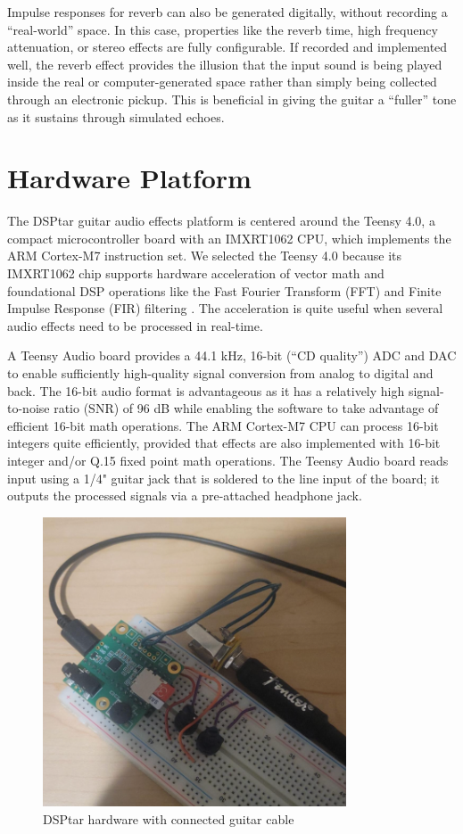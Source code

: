 \documentclass[conference]{IEEEtran}
\begin{document}
Impulse responses for reverb can also be generated digitally, without recording a ``real-world'' space. In this case, properties like the reverb time, high frequency attenuation, or stereo effects are fully configurable. If recorded and implemented well, the reverb effect provides the illusion that the input sound is being played inside the real or computer-generated space rather than simply being collected through an electronic pickup. This is beneficial in giving the guitar a ``fuller'' tone as it sustains through simulated echoes.



\section{Hardware Platform}

The DSPtar guitar audio effects platform is centered around the Teensy 4.0, a compact microcontroller board with an IMXRT1062 CPU, which implements the ARM Cortex-M7 instruction set. We selected the Teensy 4.0 because its IMXRT1062 chip supports hardware acceleration of vector math and foundational DSP operations like the Fast Fourier Transform (FFT) and Finite Impulse Response (FIR) filtering \cite{arm_dsp_cap}. The acceleration is quite useful when several audio effects need to be processed in real-time.

A Teensy Audio board provides a 44.1 kHz, 16-bit (``CD quality'') ADC and DAC to enable sufficiently high-quality signal conversion from analog to digital and back. The 16-bit audio format is advantageous as it has a relatively high signal-to-noise ratio (SNR) of 96 dB while enabling the software to take advantage of efficient 16-bit math operations. The ARM Cortex-M7 CPU can process 16-bit integers quite efficiently, provided that effects are also implemented with 16-bit integer and/or Q.15 fixed point math operations. The Teensy Audio board reads input using a 1/4" guitar jack that is soldered to the line input of the board; it outputs the processed signals via a pre-attached headphone jack.

\begin{figure}[htbp]
    \centerline{\includegraphics[width=9cm]{dsptar_hw.png}}
    \caption{DSPtar hardware with connected guitar cable}
    \label{fig:dsptar_hw}
\end{figure}
\end{document}
